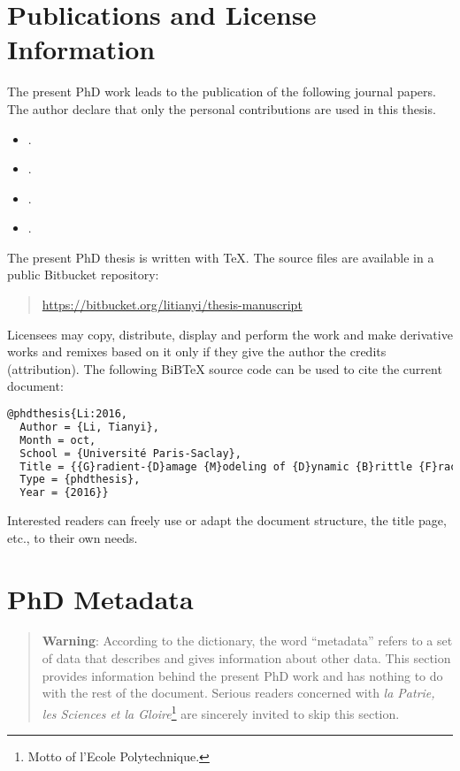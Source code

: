 \section*{Publications and License Information}
The present PhD work leads to the publication of the following journal papers. The author declare that only the personal contributions are used in this thesis.
\begin{itemize}
\item {}. 
\item {}. 
\item {}. 
\item {}. 
\end{itemize}

The present PhD thesis is written with \TeX. The source files are available in a public Bitbucket repository:
\begin{quotation}
\url{https://bitbucket.org/litianyi/thesis-manuscript}
\end{quotation}

\doclicenseThis

Licensees may copy, distribute, display and perform the work and make derivative works and remixes based on it only if they give the author the credits (attribution). The following BiBTeX source code can be used to cite the current document:
\begin{lstlisting}[language=TeX]
@phdthesis{Li:2016,
  Author = {Li, Tianyi},
  Month = oct,
  School = {Université Paris-Saclay},
  Title = {{G}radient-{D}amage {M}odeling of {D}ynamic {B}rittle {F}racture: {V}ariational {P}rinciples and {N}umerical {S}imulations},
  Type = {phdthesis},
  Year = {2016}}
\end{lstlisting}

Interested readers can freely use or adapt the document structure, the title page, etc., to their own needs.

\section*{PhD Metadata}
\begin{quotation}
\textbf{Warning}: According to the dictionary, the word ``metadata'' refers to a set of data that describes and gives information about other data. This section provides information behind the present PhD work and has nothing to do with the rest of the document. Serious readers concerned with \emph{la Patrie, les Sciences et la Gloire}\footnote{Motto of l'Ecole Polytechnique.} are sincerely invited to skip this section.
\end{quotation}

